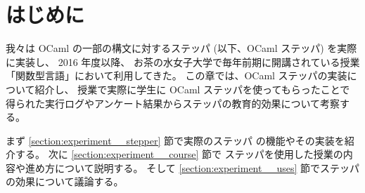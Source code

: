 \section{はじめに}
\label{section:experiment__intro}

我々は OCaml の一部の構文に対するステッパ (以下、OCaml ステッパ) を実際に実装し、
2016 年度以降、
お茶の水女子大学で毎年前期に開講されている授業「関数型言語」において利用してきた。
この章では、OCaml ステッパの実装について紹介し、
授業で実際に学生に OCaml ステッパを使ってもらったことで
得られた実行ログやアンケート結果からステッパの教育的効果について考察する。

まず \ref{section:experiment__stepper} 節で実際のステッパ
の機能やその実装を紹介する。
次に \ref{section:experiment__course} 節で
ステッパを使用した授業の内容や進め方について説明する。
そして \ref{section:experiment__uses} 節でステッパの効果について議論する。
